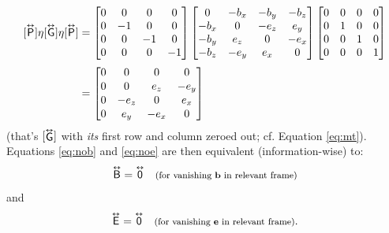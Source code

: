 \documentclass[12pt]{article}
\renewcommand{\vv}[1]{\mathbf{#1}}
\newcommand{\tightoverset}[2]{%
  \mathop{#2}\limits^{\vbox to -.5ex{\kern-0.75ex\hbox{$#1$}\vss}}}
\newcommand{\inlinedy}[1]{\tightoverset{\text{\tiny$\bm\leftrightarrow$}}{#1}}
\newcommand{\capdy}[1]{ \overset{ \text{\tiny$\bm\leftrightarrow$} }{\vphantom{\text{\small{A}}}\smash{#1}} }
\begin{document}
\begin{equation*}
\begin{aligned}
[\capdy{\mathsf{P}}] \eta [\capdy{\mathsf{G}}] \eta [\capdy{\mathsf{P}}]
&=
\begin{bmatrix}
0 & 0 & 0 & 0 \\
0 & -1 & 0 & 0 \\
0 & 0 & -1 & 0 \\
0 & 0 & 0 & -1
\end{bmatrix}
\begin{bmatrix}
0 & -b_x & -b_y & -b_z \\
-b_x & 0 & -e_z & e_y \\
-b_y & e_z & 0 & -e_x \\
-b_z & -e_y & e_x & 0
\end{bmatrix}
\begin{bmatrix}
0 & 0 & 0 & 0 \\
0 & 1 & 0 & 0 \\
0 & 0 & 1 & 0 \\
0 & 0 & 0 & 1
\end{bmatrix}
\\[.5ex]
&=
\begin{bmatrix}
0 & 0 & 0 & 0 \\[.125ex]
0 & 0 & e_z & -e_y \\[.125ex]
0 & -e_z & 0 & e_x \\[.125ex]
0 & e_y & -e_x & 0
\end{bmatrix}
\end{aligned}
\end{equation*}
(that's $[\inlinedy{\mathsf{G}}]$ with \emph{its} first row and column zeroed out; cf. Equation \ref{eq:mt}). Equations \ref{eq:nob} and \ref{eq:noe} are then equivalent (information-wise) to:
\begin{equation*}
\capdy{\mathsf{B}} = \capdy{\mathsf{0}}  \quad \text{\footnotesize{(for vanishing $\vv b$ in relevant frame)}}
\end{equation*}
and
\begin{equation*}
\capdy{\mathsf{E}} = \capdy{\mathsf{0}} \quad \text{\footnotesize{(for vanishing $\vv e$ in relevant frame)}}.
\end{equation*}
\end{document}
